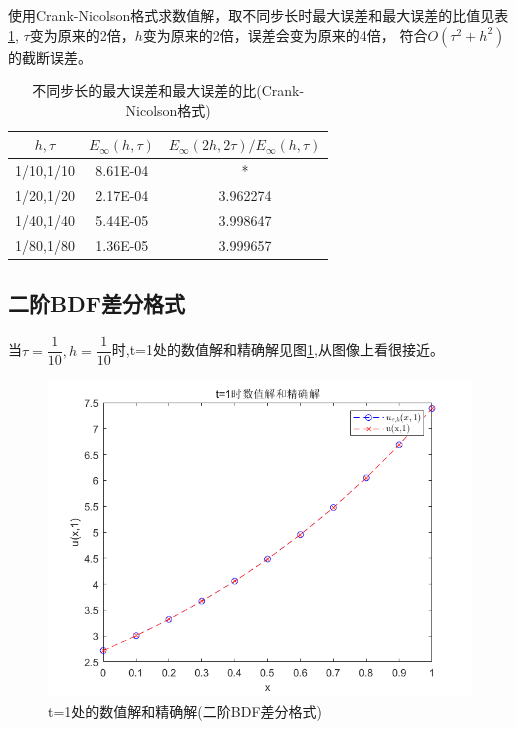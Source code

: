 \documentclass[withoutpreface,bwprint]{cumcmthesis} %
\begin{document}
使用Crank-Nicolson格式求数值解，取不同步长时最大误差和最大误差的比值见表\ref{tab:4},	 $\tau$变为原来的2倍，$h$变为原来的2倍，误差会变为原来的4倍，
符合$O(\tau^2+h^2)$的截断误差。

\begin{table}[htbp]
	\centering
	\caption{不同步长的最大误差和最大误差的比(Crank-Nicolson格式)}
	\begin{tabular}{ccc}
		\toprule[1.5pt]
		$h,\tau$   & $E_{\infty}(h,\tau)$ & $E_{\infty}(2h,2\tau)/E_{\infty}(h,\tau)$  \\
		\midrule[1pt]
		1/10,1/10 & 8.61E-04 & *    \\
		1/20,1/20 & 2.17E-04 & 3.962274  \\
		1/40,1/40 & 5.44E-05 & 3.998647   \\
		1/80,1/80 & 1.36E-05 & 3.999657   \\
		\bottomrule[1.5pt]
	\end{tabular}%
	\label{tab:4}%
\end{table}%
\subsection{二阶BDF差分格式}
当$\tau=\dfrac{1}{10},h=\dfrac{1}{10}$时,t=1处的数值解和精确解见图\ref{fig:f5},从图像上看很接近。
\begin{figure}
	\centering
	\includegraphics[width=0.7\linewidth]{figures/f5}
	\caption{t=1处的数值解和精确解(二阶BDF差分格式)}
	\label{fig:f5}
\end{figure}
\end{document}

